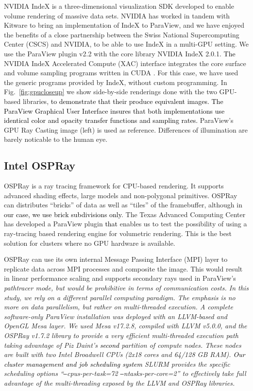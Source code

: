 \documentclass[5p,times]{elsarticle}
\begin{document}
NVIDIA IndeX \cite{NVIDIAIndeX} is a three-dimensional visualization SDK developed to enable
volume rendering of massive data sets. NVIDIA has worked in tandem with Kitware to
bring an implementation of IndeX to ParaView, and we have enjoyed the benefits
of a close partnership between the Swiss National Supercomputing Center (CSCS)
and NVIDIA, to be able to use IndeX in a multi-GPU setting. We use the ParaView
plugin v2.2 with the core library NVIDIA IndeX 2.0.1.
\textcolor{black}{The} NVIDIA IndeX Accelerated Compute (XAC) interface integrates the core surface
and volume sampling programs written in CUDA \cite{SC18IndexShowcase}.
For this case, we have used the generic programs provided by IndeX, without custom programming.
In Fig.~\ref{fig:gpucloseup} we show side-by-side renderings done with the
two GPU-based libraries, \textcolor{black}{to demonstrate that their produce equivalent images.
The ParaView Graphical User Interface insures that both implementations use identical
color and opacity transfer functions and sampling rates.} ParaView's
GPU Ray Casting image (left) is used as reference. Differences of
illumination are barely noticable to the human eye.

\subsection{Intel OSPRay}

OSPRay \cite{OSPRay} is a ray tracing framework for CPU-based rendering. It supports advanced 
shading effects, large models and non-polygonal primitives. OSPRay can distributes 
``bricks'' of data as well as ``tiles'' of the framebuffer, although in \textcolor{black}{our case, we use brick subdivisions only}. The Texas Advanced Computing Center
has developed a ParaView plugin \textcolor{black}{that} enables us to test the possibility of
using a ray-tracing based rendering engine for volumetric rendering. This is
the best solution for clusters where no GPU hardware is available.

OSPRay can use its own internal Message Passing Interface (MPI) layer to replicate
data across MPI processes and composite the image. This would result in linear
performance scaling and supports secondary rays used in ParaView's \it{pathtracer} \rm mode,
but would be prohibitive in terms of communication costs.
In this study, we rely on a different parallel computing paradigm.
The emphasis is no more on data parallelism, but rather on multi-threaded execution.
A complete \it{software-only} \rm ParaView installation was deployed with an LLVM-based and
OpenGL Mesa layer. We used Mesa v17.2.8, compiled with LLVM v5.0.0, and the
OSPRay v1.7.2 library to provide a very efficient multi-threaded execution path
taking advantage of Piz Daint's \textcolor{black}{second} partition of compute nodes. These nodes
are built with two Intel Broadwell CPUs (2x18 cores and 64/128 GB RAM). \textcolor{black}{Our
cluster management and job scheduling system} SLURM provides the specific scheduling options
``\texttt{--}cpus-per-task=72 \texttt{--}ntasks-per-core=2'' to effectively
take full advantage of the multi-threading exposed by the LLVM and OSPRay libraries. 
\end{document}
